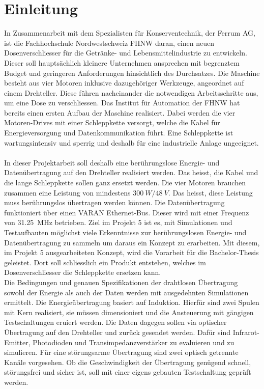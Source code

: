 \section{Einleitung}
In Zusammenarbeit mit dem Spezialisten für Konserventechnik, der Ferrum AG, ist die Fachhochschule Nordwestschweiz FHNW daran, einen neuen Dosenverschliesser für die Getränke- und Lebensmittelindustrie zu entwickeln. Dieser soll hauptsächlich kleinere Unternehmen ansprechen mit begrenztem Budget und geringeren Anforderungen hinsichtlich des Durchsatzes. Die Maschine besteht aus vier Motoren inklusive dazugehöriger Werkzeuge, angeordnet auf einem Drehteller. Diese führen nacheinander die notwendigen Arbeitsschritte aus, um eine Dose zu verschliessen. Das Institut für Automation der FHNW hat bereits einen ersten Aufbau der Maschine realisiert. Dabei werden die vier Motoren-Drives mit einer Schleppkette versorgt, welche die Kabel für Energieversorgung und Datenkommunikation führt. Eine Schleppkette ist wartungsintensiv und sperrig und deshalb für eine industrielle Anlage ungeeignet.
\newline
\ \\
In dieser Projektarbeit soll deshalb eine berührungslose Energie- und Datenübertragung auf den Drehteller realisiert werden. Das heisst, die Kabel und die lange Schleppkette sollen ganz ersetzt werden. Die vier Motoren brauchen zusammen eine Leistung von mindestens $\SI{300}{W}/\SI{48}{V}$. Das heisst, diese Leistung muss berührungslos übertragen werden können. Die Datenübertragung funktioniert über einen VARAN Ethernet-Bus. Dieser wird mit einer Frequenz von \SI{31.25}{MHz} betrieben. Ziel im Projekt 5 ist es, mit Simulationen und Testaufbauten möglichst viele Erkenntnisse zur berührungslosen Energie- und Datenübertragung zu sammeln um daraus ein Konzept zu erarbeiten. Mit diesem, im Projekt 5 ausgearbeiteten Konzept, wird die Vorarbeit für die Bachelor-Thesis geleistet. Dort soll schliesslich ein Produkt entstehen, welches im Dosenverschliesser die Schleppkette ersetzen kann.
\newline
\ \\
Die Bedingungen und genauen Spezifikationen der drahtlosen Übertragung sowohl der Energie als auch der Daten werden mit ausgedehnten Simulationen ermittelt. Die Energieübertragung basiert auf Induktion. Hierfür sind zwei Spulen mit Kern realisiert, sie müssen dimensioniert und die Ansteuerung mit gängigen Testschaltungen eruiert werden. Die Daten dagegen sollen via optischer Übertragung auf den Drehteller und zurück gesendet werden. Dafür sind Infrarot-Emitter, Photodioden und Transimpedanzverstärker zu evaluieren und zu simulieren. Für eine störungsarme Übertragung sind zwei optisch getrennte Kanäle vorgesehen. Ob die Geschwindigkeit der Übertragung genügend schnell, störungsfrei und sicher ist, soll mit einer eigens gebauten Testschaltung geprüft werden.
